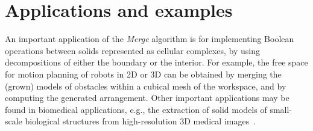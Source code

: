 %
%
%
%
%
%



\section{Applications and examples}\label{applications-and-examples}

An important application of the \emph{Merge} algorithm is for implementing Boolean operations between solids represented as cellular complexes, by using decompositions  of either the boundary or the interior. For example, the free space for motion planning of robots in 2D or 3D can be obtained by merging the (grown) models of obstacles within a cubical mesh of the workspace, and by computing   the generated arrangement. Other important applications may be found in biomedical applications, {e.g.,} the extraction of solid models of {small-scale biological structures} from high-resolution 3D medical images~\cite{ClementiSSPP-CAD16,doi:10.1080/16864360.2016.1168216}.


